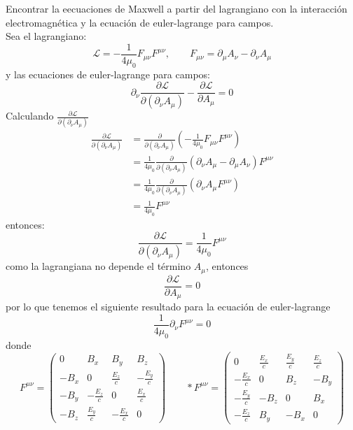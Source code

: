 \documentclass[12pt,letterpaper]{report}
\begin{document}
Encontrar la eecuaciones de Maxwell a partir del lagrangiano con la interacción electromagnética y la ecuación de euler-lagrange para campos.\\
Sea el lagrangiano:
\begin{equation*}
    \mathcal{L}=-\frac{1}{4\mu_0}F_{\mu \nu}F^{\mu\nu}, \qquad
    F_{\mu \nu}=\partial_\mu A_\nu - \partial_\nu A_\mu
\end{equation*}
y las ecuaciones de euler-lagrange para campos:
\begin{equation*}
    \partial_\nu \frac{\partial \mathcal{L}}{\partial (\partial_\nu A_\mu)}  - \frac{\partial \mathcal{L}}{\partial A_\mu} = 0
\end{equation*}
Calculando $\frac{\partial \mathcal{L}}{\partial (\partial_\nu A_\mu)} $
\begin{align*}
    \frac{\partial \mathcal{L}}{\partial (\partial_\nu A_\mu)}  &= \frac{\partial }{\partial (\partial_\nu A_\mu)} \left(-\frac{1}{4\mu_0}F_{\mu \nu}F^{\mu\nu}\right)\\
    &= \frac{1}{4\mu_0}\frac{\partial }{\partial (\partial_\nu A_\mu)} \left(\partial_\nu A_\mu-\partial_\mu A_\nu \right) F^{\mu \nu}\\
    &= \frac{1}{4\mu_0} \frac{\partial }{\partial (\partial_\nu A_\mu)} \left(\partial_\nu A_\mu F^{\mu \nu}\right) \\
    & = \frac{1}{4\mu_0} F^{\mu \nu}
\end{align*}
entonces:
\begin{equation*}
    \frac{\partial \mathcal{L}}{\partial (\partial_\nu A_\mu)}  = \frac{1}{4\mu_0} F^{\mu \nu}
\end{equation*}
como la lagrangiana no depende el término $A_\mu$, entonces
\begin{equation*}
    \frac{\partial \mathcal{L}}{\partial A_\mu} =0
\end{equation*}
por lo que tenemos el siguiente resultado para la ecuación de euler-lagrange
\begin{equation*}
    \frac{1}{4\mu_0}\partial_\nu F^{\mu \nu }=0
\end{equation*}
donde 
\begin{equation*}
    F^{\mu \nu} = \left(\begin{matrix}
        0 & B_x & B_y & B_z \\
        -B_x & 0 & \frac{E_z}{c} & -\frac{E_y}{c} \\
        -B_y & -\frac{E_z}{c}& 0 & \frac{E_x}{c} \\
        -B_z & \frac{E_y}{c} & -\frac{E_x}{c} & 0
    \end{matrix}\right) \qquad 
    *F^{\mu \nu} = \left(\begin{matrix}
        0 & \frac{E_x}{c} & \frac{E_y}{c} & \frac{E_z}{c} \\
        -\frac{E_x}{c} & 0 & B_z & -B_y \\
        -\frac{E_y}{c} & -B_z& 0 & B_x \\
        -\frac{E_z}{c} & B_y & -B_x & 0
    \end{matrix}\right)
\end{equation*}
\end{document}

